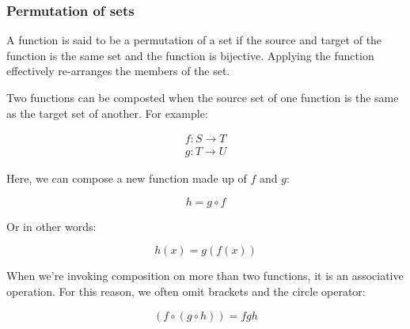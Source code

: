 \subsubsection*{Permutation of sets}

A function is said to be a permutation of a set if the source and target of the
function is the same set and the function is bijective. Applying the function
effectively re-arranges the members of the set.


Two functions can be composted when the source set of one function is the same
as the target set of another. For example:

\[
	\begin{split}
		f:S \rightarrow T\\
		g:T \rightarrow U
	\end{split}
\]

Here, we can compose a new function made up of $f$ and $g$:

\[
	h = g \circ f
\]

Or in other words:

\[
	h(x) = g(f(x))
\]

When we're invoking composition on more than two functions, it is an associative
operation. For this reason, we often omit brackets and the circle operator:

\[
	(f \circ (g \circ h)) = fgh
\]	
